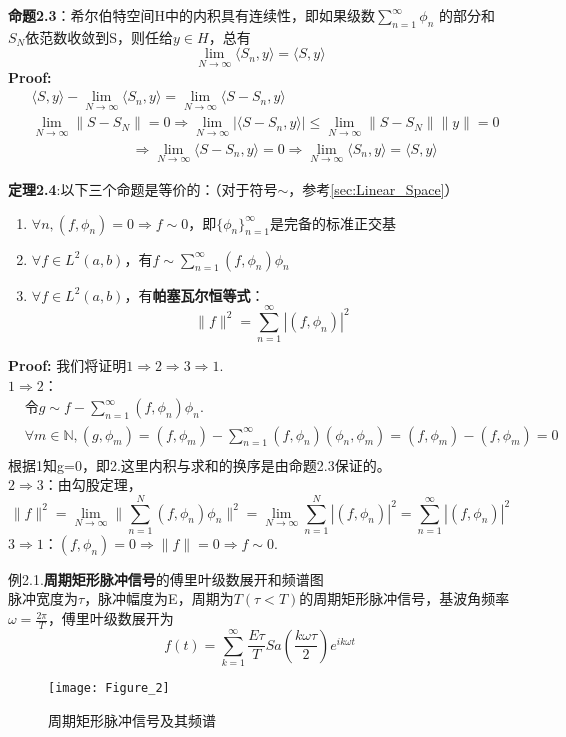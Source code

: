 \documentclass{ctexbook}
\begin{document}
\textbf{命题2.3}：希尔伯特空间H中的内积具有连续性，即如果级数$\sum_{n=1}^{\infty}\phi_n$
的部分和$S_N$依范数收敛到S，则任给$y\in H$，总有
\[\lim_{N\to\infty}\langle S_n,y\rangle=\langle S,y\rangle\]
\textbf{Proof:}\begin{align*}
     & \langle S,y\rangle-\lim_{N\to\infty}\langle S_n,y\rangle=\lim_{N\to\infty}\langle S-S_n,y\rangle                                     \\
     & \lim_{N\to\infty}\|S-S_N\|=0\Rightarrow \lim_{N\to\infty}|\langle S-S_n,y\rangle|\leq\lim_{N\to\infty}\|S-S_N\|\|y\|=0               \\
     & \hspace{3cm}\Rightarrow \lim_{N\to\infty}\langle S-S_n,y\rangle=0\Rightarrow\lim_{N\to\infty}\langle S_n,y\rangle=\langle S,y\rangle
\end{align*}

\textbf{定理2.4}:以下三个命题是等价的：（对于符号$\sim$，参考\ref{sec:Linear_Space}）
\begin{enumerate}
    \item $\forall n,(f,\phi_n)=0\Rightarrow f\sim 0$，即$\{\phi_n\}_{n=1}^{\infty}$是完备的标准正交基
    \item $\forall f\in L^2(a,b)$，有$f\sim\sum_{n=1}^{\infty}(f,\phi_n)\phi_n$
    \item $\forall f\in L^2(a,b)$，有\textbf{帕塞瓦尔恒等式}：
          \[\|f\|^2=\sum_{n=1}^{\infty}|(f,\phi_n)|^2\]
\end{enumerate}
\textbf{Proof:}
我们将证明$1\Rightarrow 2\Rightarrow 3\Rightarrow 1$.\\
$1\Rightarrow 2$：\begin{align*}
     & \text{令}g\sim f-\sum_{n=1}^{\infty}(f,\phi_n)\phi_n.                                                              \\
     & \forall m\in\mathbb{N},(g,\phi_m)=(f,\phi_m)-\sum_{n=1}^{\infty}(f,\phi_n)(\phi_n,\phi_m)=(f,\phi_m)-(f,\phi_m)=0 \\
\end{align*}
根据1知g=0，即2.这里内积与求和的换序是由命题2.3保证的。\\
$2\Rightarrow 3$：由勾股定理，
\[\|f\|^2=\lim_{N\to\infty}\|\sum_{n=1}^{N}(f,\phi_n)\phi_n\|^2=\lim_{N\to\infty}\sum_{n=1}^{N}|(f,\phi_n)|^2=\sum_{n=1}^{\infty}|(f,\phi_n)|^2\]
$3\Rightarrow 1$：$(f,\phi_n)=0\Rightarrow\|f\|=0\Rightarrow f\sim 0$.

\noindent 例2.1.\textbf{周期矩形脉冲信号}的傅里叶级数展开和频谱图\\
脉冲宽度为$\tau$，脉冲幅度为E，周期为$T (\tau<T)$的周期矩形脉冲信号，基波角频率
$\omega=\frac{2\pi}{T}$，傅里叶级数展开为
\[f(t)=\sum_{k = 1}^{\infty}  \frac{E\tau}{T}Sa(\frac{k\omega \tau}{2})e^{ik\omega t}\]
\begin{figure}[H]
    \centering
    \texttt{[image: Figure\_2]}\label{fig:2.1}
    \caption{周期矩形脉冲信号及其频谱}
\end{figure}
\end{document}
